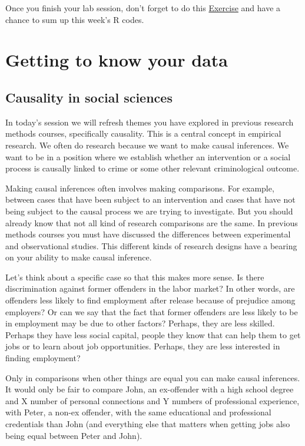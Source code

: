 \documentclass[
]{book}
\begin{document}
Once you finish your lab session, don't forget to do this \href{https://eonk.shinyapps.io/MCD_ex}{Exercise} and have a chance to sum up this week's R codes.

\chapter{Getting to know your data}\label{getting-to-know-your-data}

\section{Causality in social sciences}\label{causality-in-social-sciences}

In today's session we will refresh themes you have explored in previous research methods courses, specifically causality. This is a central concept in empirical research. We often do research because we want to make causal inferences. We want to be in a position where we establish whether an intervention or a social process is causally linked to crime or some other relevant criminological outcome.

Making causal inferences often involves making comparisons. For example, between cases that have been subject to an intervention and cases that have not being subject to the causal process we are trying to investigate. But you should already know that not all kind of research comparisons are the same. In previous methods courses you must have discussed the differences between experimental and observational studies. This different kinds of research designs have a bearing on your ability to make causal inference.

Let's think about a specific case so that this makes more sense. Is there discrimination against former offenders in the labor market? In other words, are offenders less likely to find employment after release because of prejudice among employers? Or can we say that the fact that former offenders are less likely to be in employment may be due to other factors? Perhaps, they are less skilled. Perhaps they have less social capital, people they know that can help them to get jobs or to learn about job opportunities. Perhaps, they are less interested in finding employment?

Only in comparisons when other things are equal you can make causal inferences. It would only be fair to compare John, an ex-offender with a high school degree and X number of personal connections and Y numbers of professional experience, with Peter, a non-ex offender, with the same educational and professional credentials than John (and everything else that matters when getting jobs also being equal between Peter and John).
\end{document}
